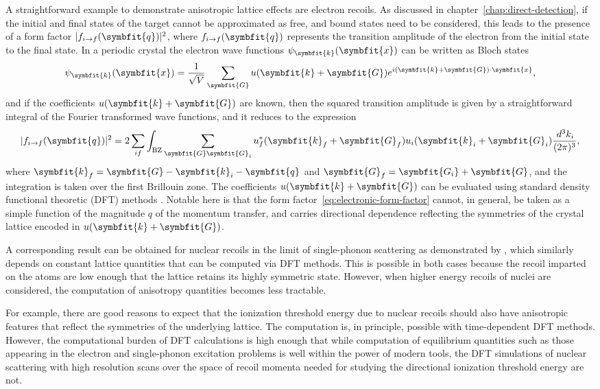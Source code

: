 \documentclass[b5paper, 10pt, twoside]{book}
\renewcommand{\vec}[1]{\symbfit{#1}}
\newcommand{\difd}{\,d}
\begin{document}
A straightforward example to demonstrate anisotropic lattice effects are electron recoils. As discussed in chapter~\ref{chap:direct-detection}, if the initial and final states of the target cannot be approximated as free, and bound states need to be considered, this leads to the presence of a form factor $|f_{i\rightarrow f}(\vec{q})|^2$, where $f_{i\rightarrow f}(\vec{q})$ represents the transition amplitude of the electron from the initial state to the final state. In a periodic crystal the electron wave functions $\psi_{\vec{k}}(\vec{x})$ can be written as Bloch states
\begin{equation}
    \psi_{\vec{k}}(\vec{x})=\frac{1}{\sqrt{V}}\sum_{\vec{G}}u(\vec{k}+\vec{G})e^{i(\vec{k}+\vec{G})\cdot\vec{x}},
\end{equation}
and if the coefficients $u(\vec{k}+\vec{G})$ are known, then the squared transition amplitude is given by a straightforward integral of the Fourier transformed wave functions, and it reduces to the expression
\begin{equation}
    |f_{i\rightarrow f}(\vec{q})|^2=2\sum_{if}\int_\text{BZ}\sum_{\vec{G}\vec{G}_i}u_f^*(\vec{k}_f+\vec{G}_f)u_i(\vec{k}_i+\vec{G}_i)\frac{\difd^3 k_i}{(2\pi)^3},
    \label{eq:electronic-form-factor}
\end{equation}
where $\vec{k}_f=\vec{G}-\vec{k}_i-\vec{q}$ and $\vec{G}_f=\vec{G_i}+\vec{G}$, and the integration is taken over the first Brillouin zone. The coefficients $u(\vec{k}+\vec{G})$ can be evaluated using standard density functional theoretic (DFT) methods \parencite{EssigEtAl2015}. Notable here is that the form factor~\eqref{eq:electronic-form-factor} cannot, in general, be taken as a simple function of the magnitude $q$ of the momentum transfer, and carries directional dependence reflecting the symmetries of the crystal lattice encoded in $u(\vec{k}+\vec{G})$.

A corresponding result can be obtained for nuclear recoils in the limit of single-phonon scattering as demonstrated by \textcite{TrickleEtAl2020}, which similarly depends on constant lattice quantities that can be computed via DFT methods. This is possible in both cases because the recoil imparted on the atoms are low enough that the lattice retains its highly symmetric state. However, when higher energy recoils of nuclei are considered, the computation of anisotropy quantities becomes less tractable.

For example, there are good reasons to expect that the ionization threshold energy due to nuclear recoils should also have anisotropic features that reflect the symmetries of the underlying lattice. The computation is, in principle, possible with time-dependent DFT methods. However, the computational burden of DFT calculations is high enough that while computation of equilibrium quantities such as those appearing in the electron and single-phonon excitation problems is well within the power of modern tools, the DFT simulations of nuclear scattering with high resolution scans over the space of recoil momenta needed for studying the directional ionization threshold energy are not.
\end{document}
